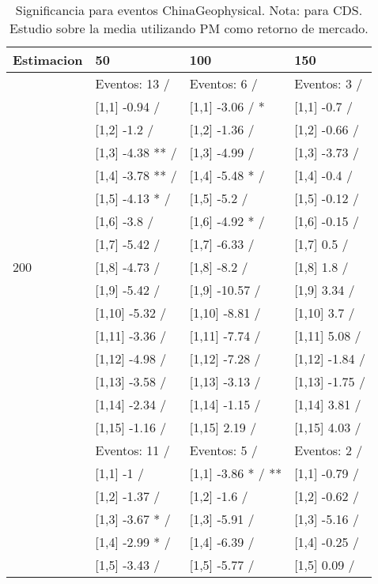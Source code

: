 \begin{table}

\caption{Significancia para eventos ChinaGeophysical. Nota: para CDS. Estudio sobre la media utilizando PM como retorno de mercado.}
\centering
\begin{tabular}[t]{llll}
\toprule
Estimacion & 50 & 100 & 150\\
\midrule
 & Eventos:  13 / & Eventos:  6 / & Eventos:  3 /\\
 & {}[1,1] -0.94  / & {}[1,1] -3.06  / * & {}[1,1] -0.7  /\\
 & {}[1,2] -1.2  / & {}[1,2] -1.36  / & {}[1,2] -0.66  /\\
 & {}[1,3] -4.38 ** / & {}[1,3] -4.99  / & {}[1,3] -3.73  /\\
 & {}[1,4] -3.78 ** / & {}[1,4] -5.48 * / & {}[1,4] -0.4  /\\
\addlinespace
 & {}[1,5] -4.13 * / & {}[1,5] -5.2  / & {}[1,5] -0.12  /\\
 & {}[1,6] -3.8  / & {}[1,6] -4.92 * / & {}[1,6] -0.15  /\\
 & {}[1,7] -5.42  / & {}[1,7] -6.33  / & {}[1,7] 0.5  /\\
200 & {}[1,8] -4.73  / & {}[1,8] -8.2  / & {}[1,8] 1.8  /\\
 & {}[1,9] -5.42  / & {}[1,9] -10.57  / & {}[1,9] 3.34  /\\
\addlinespace
 & {}[1,10] -5.32  / & {}[1,10] -8.81  / & {}[1,10] 3.7  /\\
 & {}[1,11] -3.36  / & {}[1,11] -7.74  / & {}[1,11] 5.08  /\\
 & {}[1,12] -4.98  / & {}[1,12] -7.28  / & {}[1,12] -1.84  /\\
 & {}[1,13] -3.58  / & {}[1,13] -3.13  / & {}[1,13] -1.75  /\\
 & {}[1,14] -2.34  / & {}[1,14] -1.15  / & {}[1,14] 3.81  /\\
\addlinespace
 & {}[1,15] -1.16  / & {}[1,15] 2.19  / & {}[1,15] 4.03  /\\
 & Eventos:  11 / & Eventos:  5 / & Eventos:  2 /\\
 & {}[1,1] -1  / & {}[1,1] -3.86 * / ** & {}[1,1] -0.79  /\\
 & {}[1,2] -1.37  / & {}[1,2] -1.6  / & {}[1,2] -0.62  /\\
 & {}[1,3] -3.67 * / & {}[1,3] -5.91  / & {}[1,3] -5.16  /\\
\addlinespace
 & {}[1,4] -2.99 * / & {}[1,4] -6.39  / & {}[1,4] -0.25  /\\
 & {}[1,5] -3.43  / & {}[1,5] -5.77  / & {}[1,5] 0.09  /\\

\end{tabular}
\end{table}
